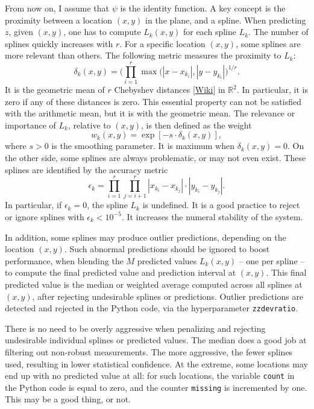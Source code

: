 \documentclass[oneside,10pt]{book}
\begin{document}
From now on, I assume that $\psi$ is the identity function. A key concept is the proximity between a location $(x,y)$ in the plane, and a spline. When predicting $z$, given $(x,y)$, one has to compute $L_k(x,y)$ for each spline $L_k$. The number of splines quickly increases with $r$. For a specific location $(x,y)$, some splines are more relevant than others. The following metric measures the proximity to $L_k$:
\begin{equation}
\delta_k(x,y)=\Big(\prod_{i=1}^r \max(|x-x_{k_i}|,|y-y_{k_i}|\Big)^{1/r} \label{feqab}.
\end{equation}
It is the geometric mean of $r$ Chebyshev distances [\href{https://en.wikipedia.org/wiki/Chebyshev_distance}{Wiki}] in $\mathbb{R}^2$. In particular, it is zero if any of these distances is zero. This essential property can not be satisfied with the arithmetic mean, but it is with the geometric mean. The relevance or importance of $L_k$, relative to $(x,y)$, is then defined as the weight 
\begin{equation}\label{fuzze1}
w_k(x,y)=\exp[-s\cdot\delta_k(x,y)],
\end{equation}
where $s>0$ is the \textcolor{index}{smoothing parameter}. It is maximum when $\delta_k(x,y)=0$. On the other side, some splines are always problematic, or may not even exist. These splines are identified by the accuracy metric
\begin{equation}
\epsilon_k=\prod_{i=1}^r \prod_{j=i+1}^r|x_{k_i}-x_{k_j}|\cdot |y_{k_i}-y_{k_j}|.\label{eqfu7}
\end{equation}
In particular, if $\epsilon_k=0$, the spline $L_k$ is undefined. It is a good practice to reject or ignore splines with $\epsilon_k<10^{-5}$. It increases the numeral stability of the system.

In addition, some splines may produce outlier predictions, depending on the location $(x,y)$. Such abnormal predictions should be ignored to boost performance, when blending the $M$ 
predicted values $L_k(x,y)$ -- one per spline -- to compute the final predicted value and prediction interval at $(x,y)$. This final predicted value is the median or weighted average computed across all splines at $(x,y)$, after rejecting undesirable splines or predictions. Outlier predictions are detected and rejected in the Python code, via the 
\textcolor{index}{hyperparameter} \texttt{zzdevratio}.

There is no need to be overly aggressive when penalizing and rejecting undesirable individual splines or predicted values. The median does a good job at filtering out non-robust 
measurements. The more aggressive, the fewer splines used, resulting in lower statistical confidence. At the extreme, some locations may end up with no predicted value at all: for such locations, the variable \texttt{count} in the Python code is equal to zero, and the counter \texttt{missing} is incremented by one. This may be a good thing, or not.  
\end{document}
